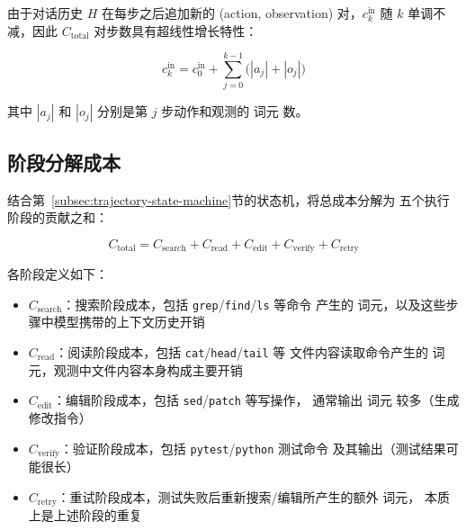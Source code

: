 由于对话历史 $H$ 在每步之后追加新的 (action, observation) 对，$c_k^{\text{in}}$ 随 $k$
单调不减，因此 $C_{\text{total}}$ 对步数具有超线性增长特性：

\begin{equation}
  c_k^{\text{in}} = c_0^{\text{in}} + \sum_{j=0}^{k-1}\bigl(|a_j| + |o_j|\bigr)
  \label{eq:cumulative-input}
\end{equation}

其中 $|a_j|$ 和 $|o_j|$ 分别是第 $j$ 步动作和观测的 词元 数。

\subsection{阶段分解成本}
\label{subsec:stage-cost}

结合第~\ref{subsec:trajectory-state-machine}节的状态机，将总成本分解为
五个执行阶段的贡献之和：

\begin{equation}
  C_{\text{total}} = C_{\text{search}} + C_{\text{read}} + C_{\text{edit}}
                    + C_{\text{verify}} + C_{\text{retry}}
  \label{eq:cost-decomposition}
\end{equation}

各阶段定义如下：
\begin{itemize}
  \item $C_{\text{search}}$：搜索阶段成本，包括 \texttt{grep}/\texttt{find}/\texttt{ls} 等命令
        产生的 词元，以及这些步骤中模型携带的上下文历史开销
  \item $C_{\text{read}}$：阅读阶段成本，包括 \texttt{cat}/\texttt{head}/\texttt{tail} 等
        文件内容读取命令产生的 词元，观测中文件内容本身构成主要开销
  \item $C_{\text{edit}}$：编辑阶段成本，包括 \texttt{sed}/\texttt{patch} 等写操作，
        通常输出 词元 较多（生成修改指令）
  \item $C_{\text{verify}}$：验证阶段成本，包括 \texttt{pytest}/\texttt{python} 测试命令
        及其输出（测试结果可能很长）
  \item $C_{\text{retry}}$：重试阶段成本，测试失败后重新搜索/编辑所产生的额外 词元，
        本质上是上述阶段的重复
\end{itemize}



